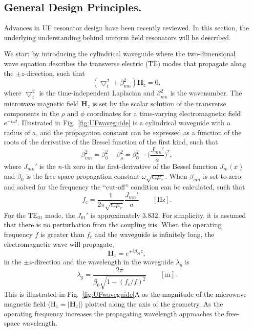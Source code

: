 \subsection*{General Design Principles.}
Advances in UF resonator design have been recently reviewed. \cite{HydeUFRev2019} In this section, the underlying understanding behind uniform field resonators will be described.

We start by introducing the cylindrical waveguide where the two-dimensional wave equation describes the transverse electric (TE) modes that propagate along the $\pm z$-direction, such that
\begin{equation}
    (\bigtriangledown_t^2 + \beta_{mn}^2) \mathbf{H}_z = 0,
\end{equation}
where $\bigtriangledown_t^2$ is the time-independent Laplacian and $\beta_{mn}^2$ is the wavenumber. The microwave magnetic field $\mathbf{H}_z$ is set by the scalar solution of the transverse components in the $\rho$ and $\phi$ coordinates for a time-varying electromagnetic field $e^{-i \omega t}$. Illustrated in Fig.~\ref{fig:UFwaveguide} is a cylindrical waveguide with a radius of $a$, and the propagation constant can be expressed as a function of the roots of the derivative of the Bessel function of the first kind, such that
\begin{equation}
    \beta_{mn}^2 = \beta_0^2 - \beta_\rho^2 = \beta_0^2 - \bigg(\frac{J_{mn}'}{a}\bigg)^2,
\end{equation}
where $J_{mn}'$ is the $n$-th zero in the first-derivative of the Bessel function $J_m(x)$ and $\beta_0$ is the free-space propagation constant $\omega\sqrt{\epsilon_r \mu_r}$. When $\beta_{mn}$ is set to zero and solved for the frequency the ``cut-off'' condition can be calculated, such that
\begin{equation}
    f_c = \frac{1}{2 \pi \sqrt{\epsilon_r \mu_r}}\frac{J_{mn}'}{a} \qquad [\text{Hz}].
\end{equation}
For the TE$_{01}$ mode, the $J_{01}'$ is approximately 3.832. For simplicity, it is assumed that there is no perturbation from the coupling iris. When the operating frequency $f$ is greater than $f_c$ and the waveguide is infinitely long, the electromagnetic wave will propagate,
\begin{equation}
    \mathbf{H}_z = e^{\pm i\beta_{01}z},\label{propH}
\end{equation}
in the $\pm z$-direction and the wavelength in the waveguide $\lambda_g$ is 
\begin{equation}
    \lambda_g = \frac{2\pi}{\beta_0 \sqrt{1-(f_c/f)^2}} \qquad [\text{m}].\label{wavelength}
\end{equation}
This is illustrated in Fig.~\ref{fig:UFwaveguide}A as the magnitude of the microwave magnetic field (H$_1 = |\mathbf{H}_z|$) plotted along the axis of the geometry. As the operating frequency increases the propagating wavelength approaches the free-space wavelength. \cite{harrington1961time} 

